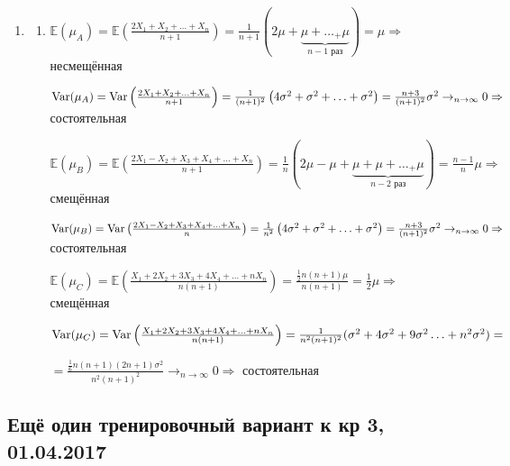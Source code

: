 \documentclass[12pt, a4paper]{article}\usepackage[]{graphicx}\usepackage[]{color}
\begin{document}
\begin{enumerate}
	\item
		\begin{enumerate}
			\item $\mathbb{E}(\mu_A) = \mathbb{E}\left(\frac{2X_1 + X_2 + \ldots + X_n}{n+1}\right) = \frac{1}{n+1} \left(2\mu + \underbrace{\mu + \ldots _+ \mu}_{n-1 \text{ раз}}\right) = \mu \Rightarrow$  несмещённая

			$\operatorname{Var}(\mu_A) = \operatorname{Var}\left(\frac{2X_1 + X_2 + \ldots + X_n}{n+1}\right) = \frac{1}{(n+1)^2}\left(4\sigma^2 + \sigma^2 + \ldots + \sigma^2\right) = \frac{n+3}{(n+1)^2} \sigma^2 \to_{n \to \infty} 0 \Rightarrow$ состоятельная

			$\mathbb{E}(\mu_B) = \mathbb{E}\left(\frac{2X_1 - X_2 + X_3 + X_4 + \ldots + X_n}{n+1}\right) = \frac{1}{n} \left(2\mu - \mu + \underbrace{\mu + \mu + \ldots _+ \mu}_{n-2 \text{ раз}}\right) = \frac{n-1}{n}\mu \Rightarrow$ смещённая

			$\operatorname{Var}(\mu_B) = \operatorname{Var}\left(\frac{2X_1 - X_2 + X_3 + X_4 + \ldots + X_n}{n}\right) = \frac{1}{n^2}\left(4\sigma^2 + \sigma^2 + \ldots + \sigma^2\right) = \frac{n+3}{(n+1)^2} \sigma^2 \to_{n \to \infty} 0 \Rightarrow$ состоятельная

			$\mathbb{E}(\mu_C) = \mathbb{E}\left(\frac{X_1 + 2X_2 + 3X_3 + 4X_4 + \ldots +n X_n}{n(n+1)}\right) = \frac{\frac{1}{2} n(n+1)\mu}{n(n+1)} = \frac{1}{2} \mu \Rightarrow $ смещённая

			$\operatorname{Var}(\mu_C) = \operatorname{Var}\left(\frac{X_1 + 2X_2 + 3X_3 + 4X_4 + \ldots + nX_n}{n(n+1)}\right) = \frac{1}{n^2(n+1)^2}(\sigma^2 + 4\sigma^2 + 9\sigma^2 \ldots + n^2\sigma^2) = $

			$=  \frac{\frac{1}{6}n(n+1)(2n+1)\sigma^2}{n^2(n+1)^2}   \to_{n \to \infty} 0 \Rightarrow$ состоятельная

		\end{enumerate}
\end{enumerate}



\subsection{Ещё один тренировочный вариант к кр 3, 01.04.2017}
\end{document}
